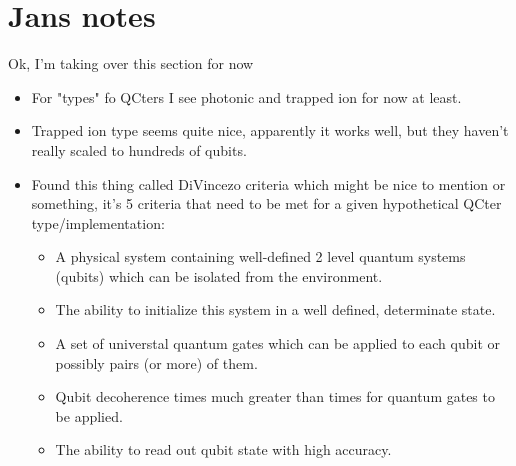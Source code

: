 \section{Jans notes}
Ok, I'm taking over this section for now
\begin{itemize}

\item
For "types" fo QCters I see photonic and trapped ion for now at least.

\item
Trapped ion type seems quite nice, apparently it works well, but they haven't really scaled to hundreds of qubits.


\item
Found this thing called DiVincezo criteria which might be nice to mention or something, it's 5 criteria that need to be met for a given
hypothetical QCter type/implementation:
\begin{itemize}
    \item A physical system containing well-defined 2 level quantum systems (qubits) which can be isolated from the environment.
    \item The ability to initialize this system in a well defined, determinate state.
    \item A set of universtal quantum gates which can be applied to each qubit or possibly pairs (or more) of them.
    \item Qubit decoherence times much greater than times for quantum gates to be applied.
    \item The ability to read out qubit state with high accuracy.
\end{itemize}

\end{itemize}


